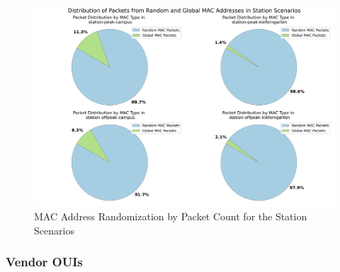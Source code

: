 \documentclass[sigconf,nonacm]{acmart}
\begin{document}
\begin{table}[ht]
    \centering
    \caption{Packet-based MAC Address Randomization Ratios in Station Scenarios}
    \label{tab:mac_randomization_station_packets}
\end{table}

\begin{figure}
    \centering
    \includegraphics[width=\columnwidth]{images/part1/mac-address-types/station-scenarios-packet-based.png}
    \caption{MAC Address Randomization by Packet Count for the Station Scenarios}
    \label{fig:station_mac_randomization_packet_count}
\end{figure}

\subsubsection{Vendor OUIs}
\label{sec:part-1/station/oui}
\end{document}
